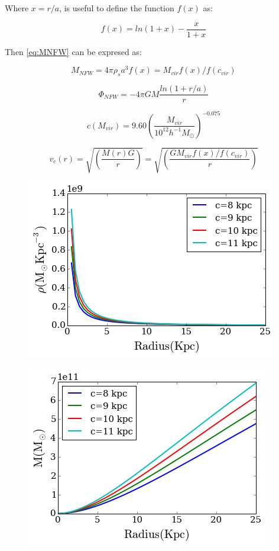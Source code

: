 Where $x = r/a$, is useful to define the function $f(x)$ as:

\begin{equation}
f(x) = ln(1 + x) - \frac{x}{1 + x} 
\end{equation}

Then \ref{eq:MNFW} can be expresed as:

\begin{equation}\label{eq:M2NFW}
M_{NFW} = 4 \pi \rho_s a^3 f(x) = M_{vir}f(x)/f(c_{vir})
\end{equation}

\begin{equation}\label{PhiNFW}
\Phi_{NFW} = -4\pi G M \frac{ln(1 + r/a)}{r}
\end{equation}

\begin{equation}\label{eq:cnfwz0}
c(M_{vir}) = 9.60  \left( \frac{M_{vir}}{10^{12}h^{-1}M_{\odot}} \right)^{-0.075}
\end{equation}



\begin{equation}\label{vcNFW}
v_c(r) = \sqrt{\left(\dfrac{M(r)G}{r}\right)} = \sqrt{\left( \dfrac{G M_{vir}  f(x) / f(c_{vir})}{r} \right)}
\end{equation}


\begin{figure}[H]
\centering
\includegraphics[scale=0.7]{../figures/NFW_density.png}
\end{figure}

\begin{figure}[H]
\centering
\includegraphics[scale=0.7]{../figures/NFW_mass.png}
\end{figure}

